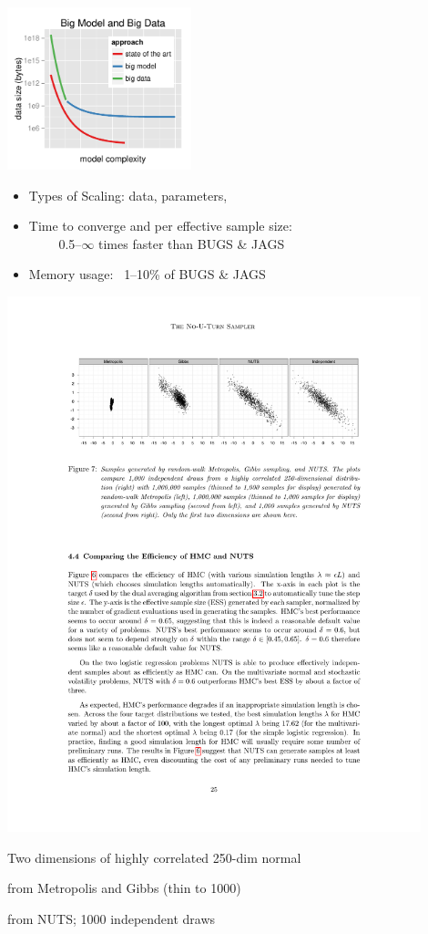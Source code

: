 \documentclass[10pt]{report}
\begin{document}
\begin{center}
\vspace*{-6pt}
\includegraphics[width=0.4\textwidth]{img/big-model-big-data.pdf}
\vspace*{-6pt}
\end{center}
\begin{itemize}
\item Types of Scaling: data, parameters, 
\item Time to converge and per effective sample size: \\[2pt]
\mbox{ } \ \ \ {0.5--{\large$\infty$} times faster than BUGS \& JAGS}
\item Memory usage: \ {1--10\% of BUGS \& JAGS}
\end{itemize}



\includegraphics[width=0.9\textwidth]{img/nuts-vs.pdf}
\begin{subitemize}
\item Two dimensions of highly correlated 250-dim normal
\item {} from Metropolis and Gibbs (thin to 1000)
\item {} from NUTS; 1000 independent draws
\end{subitemize}
\end{document}
